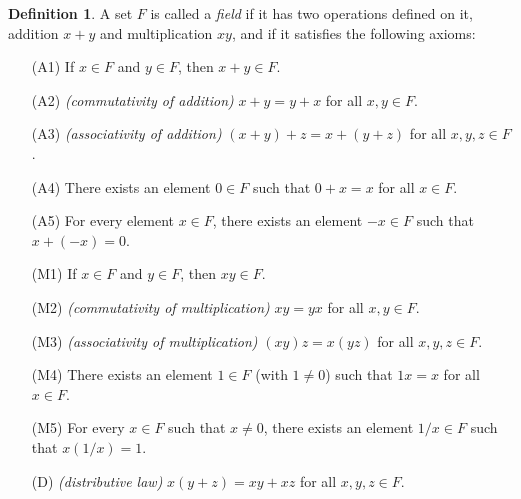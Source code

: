 \documentclass{article}
\theoremstyle{definition}
\newtheorem{definition}{Definition}[section]
\theoremstyle{remark}
\begin{document}
\begin{definition} \label{def:field}
A set \( F \) is called a \textit{field} if it has two operations defined on it, addition \( x + y \) and multiplication \( xy \), and if it satisfies the following axioms:
\begin{itemize}
\item[(A1)] If \( x \in F \) and \( y \in F \), then \( x + y \in F \).
\item[(A2)] \textit{(commutativity of addition)} \( x + y = y + x \) for all \( x, y \in F \).
\item[(A3)] \textit{(associativity of addition)} \( (x + y) + z = x + (y + z) \) for all \( x, y, z \in F \).
\item[(A4)] There exists an element \( 0 \in F \) such that \( 0 + x = x \) for all \( x \in F \).
\item[(A5)] For every element \( x \in F \), there exists an element \( -x \in F \) such that \( x + (-x) = 0 \).
\item[(M1)] If \( x \in F \) and \( y \in F \), then \( xy \in F \).
\item[(M2)] \textit{(commutativity of multiplication)} \( xy = yx \) for all \( x, y \in F \).
\item[(M3)] \textit{(associativity of multiplication)} \( (xy)z = x(yz) \) for all \( x, y, z \in F \).
\item[(M4)] There exists an element \( 1 \in F \) (with \( 1 \neq 0 \)) such that \( 1x = x \) for all \( x \in F \).
\item[(M5)] For every \( x \in F \) such that \( x \neq 0 \), there exists an element \( 1/x \in F \) such that \( x(1/x) = 1 \).
\item[(D)] \textit{(distributive law)} \( x(y+z) = xy + xz \) for all \( x, y, z \in F \).
\end{itemize}
\end{definition}
\end{document}
